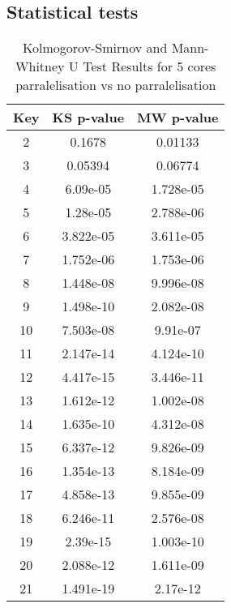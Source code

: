 \subsection{Statistical tests}
\begin{table}[h!]
  \centering
  \caption{Kolmogorov-Smirnov and Mann-Whitney U Test Results for 5 cores parralelisation vs no parralelisation}
  \begin{tabular}{||c|c|c||}
    \toprule
    \textbf{Key} & \textbf{KS p-value} & \textbf{MW p-value} \\
    \midrule
    2            & 0.1678              & 0.01133             \\
    3            & 0.05394             & 0.06774             \\
    4            & 6.09e-05            & 1.728e-05           \\
    5            & 1.28e-05            & 2.788e-06           \\
    6            & 3.822e-05           & 3.611e-05           \\
    7            & 1.752e-06           & 1.753e-06           \\
    8            & 1.448e-08           & 9.996e-08           \\
    9            & 1.498e-10           & 2.082e-08           \\
    10           & 7.503e-08           & 9.91e-07            \\
    11           & 2.147e-14           & 4.124e-10           \\
    12           & 4.417e-15           & 3.446e-11           \\
    13           & 1.612e-12           & 1.002e-08           \\
    14           & 1.635e-10           & 4.312e-08           \\
    15           & 6.337e-12           & 9.826e-09           \\
    16           & 1.354e-13           & 8.184e-09           \\
    17           & 4.858e-13           & 9.855e-09           \\
    18           & 6.246e-11           & 2.576e-08           \\
    19           & 2.39e-15            & 1.003e-10           \\
    20           & 2.088e-12           & 1.611e-09           \\
    21           & 1.491e-19           & 2.17e-12            \\

\end{tabular}
\end{table}
